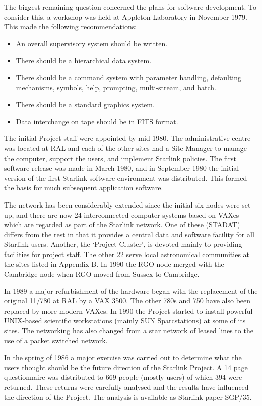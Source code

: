 The biggest remaining question concerned the plans for software development.
To consider this, a workshop was held at Appleton Laboratory in November 1979.
This made the following recommendations:
\begin{itemize}
\item An overall supervisory system should be written.
\item There should be a hierarchical data system.
\item There should be a command system with parameter handling, defaulting
mechanisms, symbols, help, prompting, multi-stream, and batch.
\item There should be a standard graphics system.
\item Data interchange on tape should be in FITS format.
\end{itemize}
The initial Project staff were appointed by mid 1980.
The administrative centre was located at RAL and each of the other sites had a
Site Manager to manage the computer, support the users, and implement Starlink
policies.
The first software release was made in March 1980, and in September 1980 the
initial version of the first Starlink software environment was distributed.
This formed the basis for much subsequent application software.

The network has been considerably extended since the initial six nodes were set
up, and there are now 24 interconnected computer systems based on VAXes which
are regarded as part of the Starlink network.
One of these (STADAT) differs from the rest in that it provides a central data
and software facility for all Starlink users.
Another, the `Project Cluster', is devoted mainly to providing facilities for
project staff.
The other 22 serve local astronomical communities at the sites listed in
Appendix B.
In 1990 the RGO node merged with the Cambridge node when RGO moved from
Sussex to Cambridge.

In 1989 a major refurbishment of the hardware began with the replacement of
the original 11/780 at RAL by a VAX 3500.
The other 780s and 750 have also been replaced by more modern VAXes.
In 1990 the Project started to install powerful UNIX-based scientific
workstations (mainly SUN Sparcstations) at some of its sites.
The networking has also changed from a star network of leased lines to the use
of a packet switched network.

In the spring of 1986 a major exercise was carried out to determine what the
users thought should be the future direction of the Starlink Project.
A 14 page questionnaire was distributed to 669 people (mostly users) of which
394 were returned.
These returns were carefully analysed and the results have influenced the
direction of the Project.
The analysis is available as Starlink paper SGP/35.

